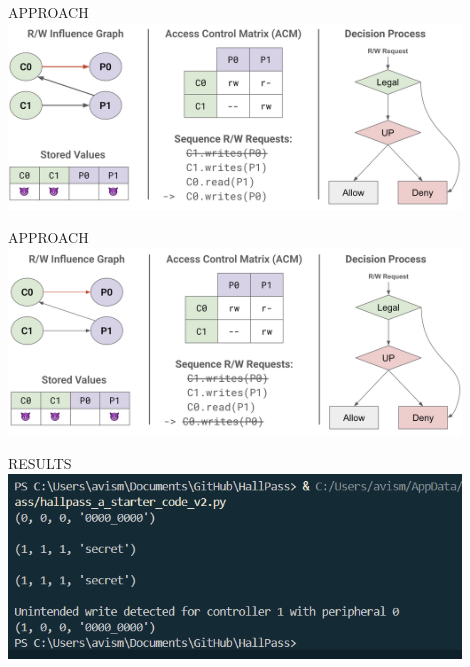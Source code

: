 \begin{frame}{APPROACH}
    \centering
    \includegraphics[height=0.9\textheight,width=0.9\textwidth,keepaspectratio]{slide 4.png}
\end{frame}

\begin{frame}{APPROACH}
    \centering
    \includegraphics[height=0.9\textheight,width=0.9\textwidth,keepaspectratio]{slide 5.png}
\end{frame}

\begin{frame}{RESULTS}
    \centering
    \includegraphics[height=0.9\textheight,width=0.9\textwidth,keepaspectratio]{coderesults.png}
\end{frame}

